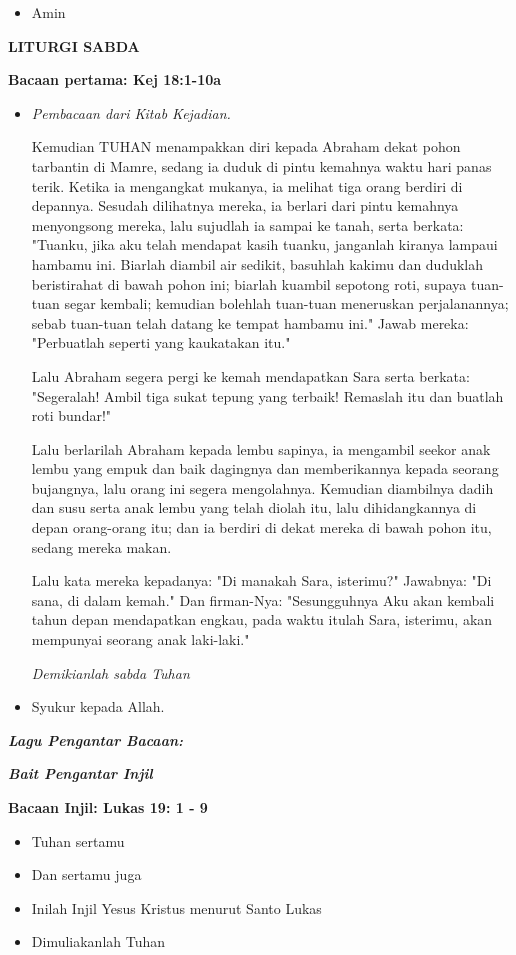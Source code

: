 \documentclass[a4paper,11pt]{scrbook}
\makeatletter
\newcommand{\judul}[1]{%
  {\parindent \z@ \centering 
    \interlinepenalty\@M \Large \bfseries #1\par\nobreak \vskip 20\p@ }}
\newcommand{\subjudul}[1]{%
  {\parindent \z@ 
    \interlinepenalty\@M \bfseries #1\par\nobreak \vskip 10\p@ }}
\newcommand{\lagu}[1]{%
  {\parindent \z@ 
    \interlinepenalty\@M \bfseries \textsl{#1}\par\nobreak \vskip 20\p@ }}
\newcommand{\BU}[1]{\begin{itemize} \item[U:] #1 \end{itemize}}
\newcommand{\BI}[1]{\begin{itemize} \item[I:] #1 \end{itemize}}
\newcommand{\BP}[1]{\begin{itemize} \item[P:] #1 \end{itemize}}
\newcommand{\laguantarbacaan}{~ }
\makeatother
\begin{document}
\BU{Amin}

\judul{LITURGI SABDA}

\subjudul{Bacaan pertama: Kej 18:1-10a}

\BP{\emph{Pembacaan dari Kitab Kejadian.}

Kemudian TUHAN menampakkan diri kepada Abraham dekat pohon tarbantin di Mamre, sedang ia duduk di pintu kemahnya waktu hari panas terik.
Ketika ia mengangkat mukanya, ia melihat tiga orang berdiri di depannya. Sesudah dilihatnya mereka, ia berlari dari pintu kemahnya menyongsong mereka, lalu sujudlah ia sampai ke tanah,
serta berkata: "Tuanku, jika aku telah mendapat kasih tuanku, janganlah kiranya lampaui hambamu ini.
Biarlah diambil air sedikit, basuhlah kakimu dan duduklah beristirahat di bawah pohon ini;
biarlah kuambil sepotong roti, supaya tuan-tuan segar kembali; kemudian bolehlah tuan-tuan meneruskan perjalanannya; sebab tuan-tuan telah datang ke tempat hambamu ini." Jawab mereka: "Perbuatlah seperti yang kaukatakan itu."

Lalu Abraham segera pergi ke kemah mendapatkan Sara serta berkata: "Segeralah! Ambil tiga sukat tepung yang terbaik! Remaslah itu dan buatlah roti bundar!"

Lalu berlarilah Abraham kepada lembu sapinya, ia mengambil seekor anak lembu yang empuk dan baik dagingnya dan memberikannya kepada seorang bujangnya, lalu orang ini segera mengolahnya.
Kemudian diambilnya dadih dan susu serta anak lembu yang telah diolah itu, lalu dihidangkannya di depan orang-orang itu; dan ia berdiri di dekat mereka di bawah pohon itu, sedang mereka makan.

Lalu kata mereka kepadanya: "Di manakah Sara, isterimu?" Jawabnya: "Di sana, di dalam kemah."
Dan firman-Nya: "Sesungguhnya Aku akan kembali tahun depan mendapatkan engkau, pada waktu itulah Sara, isterimu, akan mempunyai seorang anak laki-laki." 

\emph{Demikianlah sabda Tuhan}
}

\BU{Syukur kepada Allah.}

\lagu{Lagu Pengantar Bacaan: \laguantarbacaan}

\lagu{Bait Pengantar Injil}

\subjudul{Bacaan Injil: Lukas 19: 1 - 9}

\BI{Tuhan sertamu}

\BU{Dan sertamu juga}

\BI{Inilah Injil Yesus Kristus menurut Santo Lukas}

\BU{Dimuliakanlah Tuhan}
\end{document}
